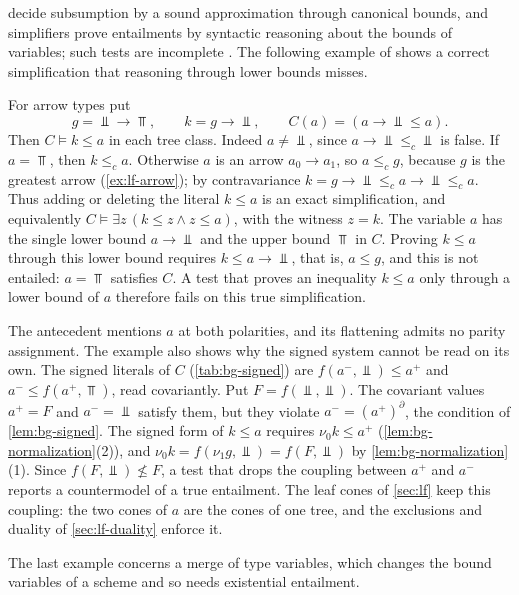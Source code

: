 \citet{TrifonovSmith96} decide subsumption by a sound approximation through
canonical bounds, and simplifiers prove entailments by syntactic reasoning
about the bounds of variables; such tests are incomplete \citep{Pottier01}. The
following example of \citet[Section~8.5]{Pottier98thesis} shows a correct
simplification that reasoning through lower bounds misses.

\begin{example}\label{ex:ap-pottier}
For arrow types put
\[
 g=\Bot\to\Top,\qquad k=g\to\Bot,\qquad C(a)=(a\to\Bot\le a).
\]
Then $C\models k\le a$ in each tree class. Indeed $a\ne\Bot$, since
$a\to\Bot\le_c\Bot$ is false. If $a=\Top$, then $k\le_c a$. Otherwise $a$ is an
arrow $a_0\to a_1$, so $a\le_c g$, because $g$ is the greatest arrow
(\cref{ex:lf-arrow}); by contravariance $k=g\to\Bot\le_c a\to\Bot\le_c a$. Thus
adding or deleting the literal $k\le a$ is an exact simplification, and
equivalently $C\models\exists z\,(k\le z\wedge z\le a)$, with the witness
$z=k$. The variable $a$ has the single lower bound $a\to\Bot$
and the upper bound $\Top$ in $C$. Proving $k\le a$ through this lower bound
requires $k\le a\to\Bot$, that is, $a\le g$, and this is not entailed:
$a=\Top$ satisfies $C$. A test that proves an inequality $k\le a$ only through a
lower bound of $a$ therefore fails on this true simplification.

The antecedent mentions $a$ at both polarities, and its flattening admits no
parity assignment. The example also shows why the signed system cannot be read on its
own. The signed literals of $C$ (\cref{tab:bg-signed}) are
$f(a^-,\Bot)\le a^+$ and $a^-\le f(a^+,\Top)$, read covariantly. Put
$F=f(\Bot,\Bot)$. The covariant values $a^+=F$ and $a^-=\Bot$ satisfy them, but
they violate $a^-=(a^+)^\partial$, the condition of \cref{lem:bg-signed}. The
signed form of $k\le a$ requires $\nu_0k\le a^+$
(\cref{lem:bg-normalization}(2)), and $\nu_0k=f(\nu_1g,\Bot)=f(F,\Bot)$ by
\cref{lem:bg-normalization}(1). Since $f(F,\Bot)\not\le F$, a test that drops
the coupling between $a^+$ and $a^-$ reports a countermodel of a true
entailment. The leaf cones of \cref{sec:lf} keep this coupling: the two cones
of $a$ are the cones of one tree, and the exclusions and duality of
\cref{sec:lf-duality} enforce it.
\end{example}

The last example concerns a merge of type variables, which changes the bound
variables of a scheme and so needs existential entailment.

